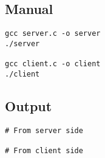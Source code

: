 \documentclass[12pt]{article}
\begin{document}
\subsection{Manual}

\begin{lstlisting}
gcc server.c -o server
./server

gcc client.c -o client
./client
\end{lstlisting}

\subsection{Output}

\begin{lstlisting}
# From server side

# From client side
\end{lstlisting}










\end{document}
